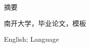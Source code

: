 

\begin{zhaiyao}
\begin{spacing}{1.5}
摘要
\end{spacing}
\end{zhaiyao}




\begin{guanjianci}
南开大学，毕业论文，模板
\end{guanjianci}



\begin{abstract}
\begin{spacing}{1.5}
abstract    
\end{spacing}
\end{abstract}


\begin{keywords}
English; Language
\end{keywords} 